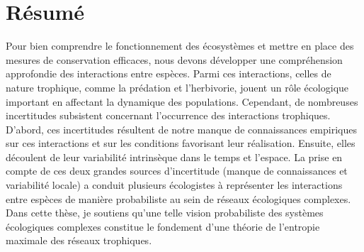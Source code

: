 \documentclass[12pt,twoside,phd]{dms}
\numberwithin{equation}{section}
\numberwithin{table}{chapter}
\numberwithin{figure}{chapter}
\begin{document}
\maketitle
\newpage
\maketitle

\doublespacing


\francais

\setlength{\parskip}{6pt}%

\chapter*{Résumé}

Pour bien comprendre le fonctionnement des écosystèmes et mettre en place des
mesures de conservation efficaces, nous devons développer une compréhension
approfondie des interactions entre espèces. Parmi ces interactions, celles de
nature trophique, comme la prédation et l'herbivorie, jouent un rôle écologique
important en affectant la dynamique des populations. Cependant, de nombreuses
incertitudes subsistent concernant l'occurrence des interactions trophiques.
D'abord, ces incertitudes résultent de notre manque de connaissances empiriques
sur ces interactions et sur les conditions favorisant leur réalisation. Ensuite,
elles découlent de leur variabilité intrinsèque dans le temps et l'espace. La
prise en compte de ces deux grandes sources d'incertitude (manque de
connaissances et variabilité locale) a conduit plusieurs écologistes à
représenter les interactions entre espèces de manière probabiliste au sein de
réseaux écologiques complexes. Dans cette thèse, je soutiens qu'une telle vision
probabiliste des systèmes écologiques complexes constitue le fondement d'une
théorie de l'entropie maximale des réseaux trophiques. 
\end{document}
